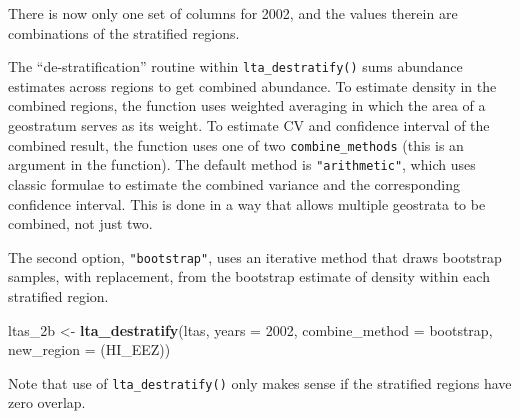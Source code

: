 \documentclass[
]{book}
\newenvironment{Shaded}{\begin{snugshade}}{\end{snugshade}}
\newcommand{\AttributeTok}[1]{\textcolor[rgb]{0.13,0.29,0.53}{#1}}
\newcommand{\ConstantTok}[1]{\textcolor[rgb]{0.56,0.35,0.01}{#1}}
\newcommand{\ControlFlowTok}[1]{\textcolor[rgb]{0.13,0.29,0.53}{\textbf{#1}}}
\newcommand{\DecValTok}[1]{\textcolor[rgb]{0.00,0.00,0.81}{#1}}
\newcommand{\FunctionTok}[1]{\textcolor[rgb]{0.13,0.29,0.53}{\textbf{#1}}}
\newcommand{\NormalTok}[1]{#1}
\newcommand{\OtherTok}[1]{\textcolor[rgb]{0.56,0.35,0.01}{#1}}
\newcommand{\SpecialCharTok}[1]{\textcolor[rgb]{0.81,0.36,0.00}{\textbf{#1}}}
\newcommand{\StringTok}[1]{\textcolor[rgb]{0.31,0.60,0.02}{#1}}
\begin{document}
There is now only one set of columns for 2002, and the values therein are combinations of the stratified regions.

The ``de-stratification'' routine within \texttt{lta\_destratify()} sums abundance estimates across regions to get combined abundance. To estimate density in the combined regions, the function uses weighted averaging in which the area of a geostratum serves as its weight. To estimate CV and confidence interval of the combined result, the function uses one of two \texttt{combine\_methods} (this is an argument in the function). The default method is \texttt{"arithmetic"}, which uses classic formulae to estimate the combined variance and the corresponding confidence interval. This is done in a way that allows multiple geostrata to be combined, not just two.

The second option, \texttt{"bootstrap"}, uses an iterative method that draws bootstrap samples, with replacement, from the bootstrap estimate of density within each stratified region.

\begin{Shaded}
\begin{Highlighting}[]
\NormalTok{ltas\_2b }\OtherTok{\textless{}{-}}
  \FunctionTok{lta\_destratify}\NormalTok{(ltas,}
               \AttributeTok{years =} \DecValTok{2002}\NormalTok{,}
               \AttributeTok{combine\_method =} \StringTok{\textquotesingle{}bootstrap\textquotesingle{}}\NormalTok{,}
               \AttributeTok{new\_region =} \StringTok{\textquotesingle{}(HI\_EEZ)\textquotesingle{}}\NormalTok{)}
\end{Highlighting}
\end{Shaded}

\begin{Shaded}
\end{Shaded}

Note that use of \texttt{lta\_destratify()} only makes sense if the stratified regions have zero overlap.
\end{document}

